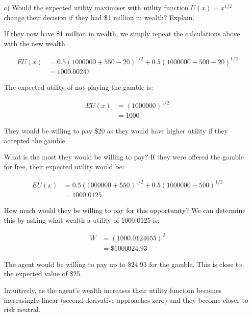 \documentclass[
  letterpaper,
  DIV=11,
  numbers=noendperiod]{scrreprt}
\begin{document}
c) Would the expected utility maximiser with utility function
\(U(x)=x^{1/2}\) change their decision if they had \$1 million in
wealth? Explain.

\begin{tcolorbox}[enhanced jigsaw, title=\textcolor{quarto-callout-tip-color}{\faLightbulb}\hspace{0.5em}{Answer}, toprule=.15mm, colback=white, breakable, titlerule=0mm, colframe=quarto-callout-tip-color-frame, coltitle=black, opacityback=0, rightrule=.15mm, colbacktitle=quarto-callout-tip-color!10!white, bottomtitle=1mm, opacitybacktitle=0.6, arc=.35mm, bottomrule=.15mm, toptitle=1mm, leftrule=.75mm, left=2mm]

If they now have \$1 million in wealth, we simply repeat the
calculations above with the new wealth.

\begin{align*}
EU(x)&=0.5(1000000+550-20)^{1/2}+0.5(1000000-500-20)^{1/2} \\[6pt]
&=1000.00247
\end{align*}

The expected utility of not playing the gamble is:

\begin{align*}
EU(x)&=(1000000)^{1/2} \\[6pt]
&=1000
\end{align*}

They would be willing to pay \$20 as they would have higher utility if
they accepted the gamble.

What is the most they would be willing to pay? If they were offered the
gamble for free, their expected utility would be:

\begin{align*}
EU(x)&=0.5(1000000+550)^{1/2}+0.5(1000000-500)^{1/2} \\[6pt]
&=1000.0125
\end{align*}

How much would they be willing to pay for this opportunity? We can
determine this by asking what wealth a utility of 1000.0125 is:

\begin{align*}
W&=(1000.0124655)^2 \\[6pt]
&=\$1000024.93
\end{align*}

The agent would be willing to pay up to \$24.93 for the gamble. This is
close to the expected value of \$25.

Intuitively, as the agent's wealth increases their utility function
becomes increasingly linear (second derivative approaches zero) and they
become closer to risk neutral.

\end{tcolorbox}
\end{document}
